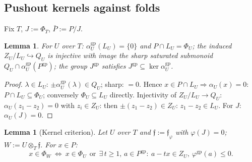 \documentclass[11pt]{article}
\newtheorem{lemma}[theorem]{Lemma}
\theoremstyle{definition}
\newcommand{\gp}{\mathrm{gp}}
\begin{document}
\subsection{Pushout kernels against folds}

Fix $T$, $J:=\Phi_T$, $\bar P:=P/J$.

\begin{lemma}\label{lem:Zpointed}
For $U$ over $T$: $\alpha_U^{\gp}(L_U)=\{0\}$ and
$P\cap L_U=\Phi_U$; the induced
$Z_U/L_U\hookrightarrow Q_U$ is injective with image the sharp
saturated submonoid $Q_U\cap\alpha_U^{\gp}(P^{\gp})$; the group
$J^{\gp}$ satisfies $J^{\gp}\subseteq\ker\alpha_U^{\gp}$.
\end{lemma}

\begin{proof}
$\lambda\in L_U$: $\pm\alpha_U^{\gp}(\lambda)\in Q_U$; sharp:
$=0$. Hence $x\in P\cap L_U\Rightarrow\alpha_U(x)=0$:
$P\cap L_U\subseteq\Phi_U$; conversely $\Phi_U\subseteq L_U$ directly.
Injectivity of $Z_U/L_U\to Q_U$: $\alpha_U(z_1-z_2)=0$ with
$z_i\in Z_U$: then $\pm(z_1-z_2)\in Z_U$: $z_1-z_2\in L_U$. For $J$:
$\alpha_U(J)=0$.
\end{proof}

\begin{lemma}[Kernel criterion]\label{lem:pushout}
Let $U$ over $T$ and $\mathfrak f:=\mathfrak f_\varphi$ with
$\varphi(J)=0$; $W:=U\otimes_T\mathfrak f$. For $x\in P$:
\[
x\in\Phi_W\ \Longleftrightarrow\ x\in\Phi_U\ \ \text{or}\ \
\exists\,t\ge1,\,a\in P^{\gp}:\ a-tx\in Z_U,\ \varphi^{\gp}(a)\le0 .
\]
\end{lemma}
\end{document}
